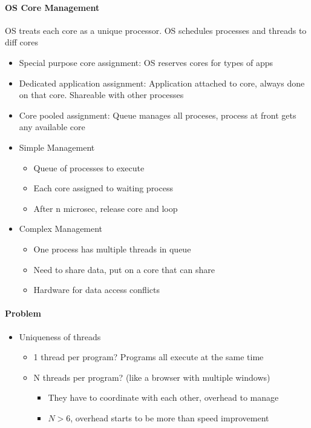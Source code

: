 \documentclass[12 pt]{article}
\begin{document}
\paragraph{OS Core Management}
OS treats each core as a unique processor. OS schedules processes and threads to diff cores
\begin{itemize}
\item Special purpose core assignment: OS reserves cores for types of apps
\item Dedicated application assignment: Application attached to core, always done on that core. Shareable with other processes
\item Core pooled assignment: Queue manages all proceses, process at front gets any available core
\item Simple Management
\begin{itemize}
\item Queue of processes to execute
\item Each core assigned to waiting process
\item After n microsec, release core and loop
\end{itemize}
\item Complex Management
\begin{itemize}
\item One process has multiple threads in queue
\item Need to share data, put on a core that can share
\item Hardware for data access conflicts
\end{itemize}
\end{itemize}
\paragraph{Problem}
\begin{itemize}
\item Uniqueness of threads
\begin{itemize}
\item 1 thread per program? Programs all execute at the same time
\item N threads per program? (like a browser with multiple windows)
\begin{itemize}
\item They have to coordinate with each other, overhead to manage
\item $N>6$, overhead starts to be more than speed improvement
\end{itemize}
\end{itemize}
\end{itemize}
\end{document}
